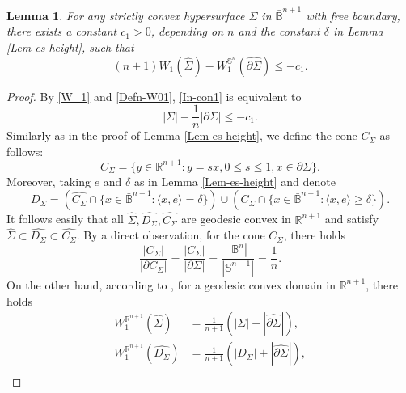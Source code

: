\documentclass[11pt,reqno]{amsart}
\newtheorem{lem}[thm]{Lemma}
\theoremstyle{definition}
\theoremstyle{remark}
\numberwithin{equation}{section}
\renewcommand{\(}{\left(}
\renewcommand{\)}{\right)}
\renewcommand{\-}{\overline}
\begin{document}
\begin{lem}\label{es-con}
	For any strictly convex hypersurface $\Sigma$ in $\bar{\mathbb{B}}^{n+1}$ with free boundary, there exists a constant $c_1>0$, depending on $n$ and the constant $\delta$ in Lemma \ref{Lem-es-height}, such that
	\begin{equation}\label{In-con1}
		(n+1)W_1(\widehat{\Sigma})-W_1^{\mathbb{S}^n}(\widehat{\partial\Sigma})\leq -c_1.
	\end{equation}
\end{lem}
\begin{proof}
	By \eqref{W_1} and \eqref{Defn-W01}, \eqref{In-con1} is equivalent to
	\begin{equation}\label{In-con2}
		|\Sigma|-\frac{1}{n}|\partial\Sigma|\leq -c_1.
	\end{equation}
Similarly as in the proof of Lemma \ref{Lem-es-height}, we define the cone $C_{\Sigma}$ as follows:
\begin{equation}\label{Defn-convex cone}
	C_{\Sigma}=\{y\in\mathbb{R}^{n+1}:y=sx, 0\leq s\leq 1,x\in\partial\Sigma\}. 
\end{equation}
Moreover, taking $e$ and $\delta$ as in Lemma \ref{Lem-es-height} and denote
\begin{equation}\label{Defn-tildecone}
	D_{\Sigma}=\left(\widehat{C_{\Sigma}}\cap \{x\in\bar{\mathbb{B}}^{n+1}:\langle x,e\rangle=\delta\}\right)\cup\left(C_{\Sigma}\cap \{x\in\bar{\mathbb{B}}^{n+1}:\langle x,e\rangle\geq\delta\}\right).
\end{equation}
It follows easily that all $\widehat{\Sigma}, \widehat{D_{\Sigma}}, \widehat{C_{\Sigma}}$ are geodesic convex in $\mathbb{R}^{n+1}$ and satisfy $\widehat{\Sigma}\subset \widehat{{D}_{\Sigma}}\subset\widehat{C_{\Sigma}}$. By a direct observation, for the cone $C_{\Sigma}$, there holds
\begin{equation}\label{eq-re-cone}
	\frac{|C_{\Sigma}|}{|\partial C_{\Sigma}|}=\frac{|C_{\Sigma}|}{|\partial\Sigma|}=\frac{|\mathbb{B}^n|}{|\mathbb{S}^{n-1}|}=\frac{1}{n}.
\end{equation}
On the other hand, according to \cite[III.13.2]{San04}, for a geodesic convex domain in $\mathbb{R}^{n+1}$, there holds
\begin{align}
	W_1^{\mathbb{R}^{n+1}}(\widehat{\Sigma})&=\frac{1}{n+1}(|\Sigma|+|\widehat{\partial\Sigma}|),\label{W_1Sigma}\\
	W_1^{\mathbb{R}^{n+1}}(\widehat{D_{\Sigma}})&=\frac{1}{n+1}(|D_{\Sigma}|+|\widehat{\partial\Sigma}|),\label{W_1tildeCSigma}\\

\end{align}
\end{proof}
\end{document}

